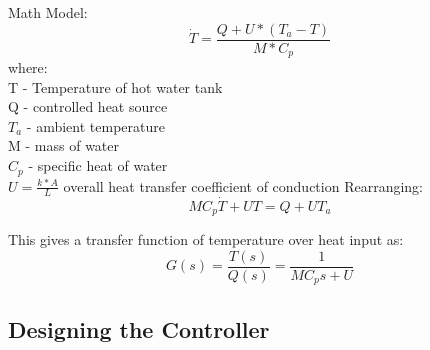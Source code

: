 Math Model:
\\
\begin{equation}
\dot{T} = \frac{Q+U*(T_a-T)}{M*C_p}
\end{equation}
where: \\
T - Temperature of hot water tank \\
Q - controlled heat source \\
\(T_a\) - ambient temperature \\
M - mass of water \\
\(C_p\) - specific heat of water \\
\(U = \frac{k*A}{L} \) overall heat transfer coefficient of conduction
\newline
\newline
Rearranging: \\
\begin{equation}
M C_p \dot{T} + U T = Q + U T_a
\end{equation}

\noindent
\newline
This gives a transfer function of temperature over heat input as:
\begin{equation}
G(s) = \frac{T(s)}{Q(s)} = \frac{1}{M C_p s + U}
\end{equation}

\subsection *{Designing the Controller}

